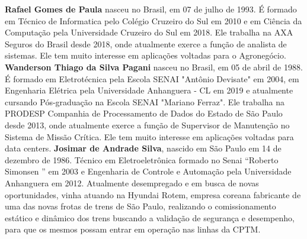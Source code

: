 \documentclass[
	article,			%
	12pt,				%
	oneside,			%
	a4paper,			%
	english,			%
	brazil,				%
	sumario=tradicional
	]{abntex2}
\begin{document}
\newpage
\textbf{Rafael Gomes de Paula} nasceu no Brasil, em 07 de julho de 1993. É formado em Técnico de Informatica pelo Colégio Cruzeiro do Sul em 2010 e em Ciência da Computação pela Universidade Cruzeiro do Sul em 2018. Ele trabalha na AXA Seguros do Brasil desde
2018, onde atualmente exerce a função de analista de sistemas.
Ele tem muito interesse em aplicações voltadas para o Agronegócio.
\newline
\newline\textbf{Wanderson Thiago da Silva Pagani} nasceu no Brasil, em 05 de abril de 1988. É formado em Eletrotécnica pela Escola SENAI "Antônio Devisate" em 2004, em Engenharia Elétrica pela Universidade Anhanguera - CL em 2019 e atualmente cursando Pós-graduação na Escola SENAI "Mariano Ferraz". Ele trabalha na PRODESP Companhia de Processamento de Dados do Estado de São Paulo desde
2013, onde atualmente exerce a função de Supervisor de Manutenção no Sistema de Missão Crítica.
Ele tem muito interesse em aplicações voltadas para data centers.
\newline
\newline\textbf{Josimar de Andrade Silva}, nascido em São Paulo em 14 de dezembro de 1986. Técnico em Eletroeletrônica formado no Senai “Roberto Simonsen ” em 2003 e Engenharia de Controle e Automação pela Universidade Anhanguera em 2012. Atualmente desempregado e em busca de novas oportunidades, vinha atuando na Hyundai Rotem, empresa coreana fabricante de uma das novas frotas de trens de São Paulo, realizando o comissionamento estático e dinâmico dos trens buscando a validação de segurança e desempenho, para que os mesmos possam entrar em operação nas linhas da CPTM.
\end{document}
